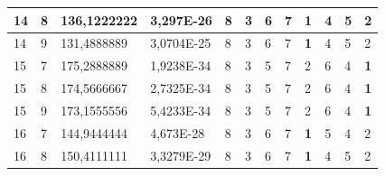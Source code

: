 \documentclass[conference]{IEEEtran}
\begin{document}
\begin{table}[]
\begin{tabular}{|llll|llllllll|}
		\multicolumn{1}{|l|}{14}  & \multicolumn{1}{l|}{8}         & \multicolumn{1}{l|}{136,1222222}   & 3,297E-26  & \multicolumn{1}{l|}{8}   & \multicolumn{1}{l|}{3}   & \multicolumn{1}{l|}{6}   & \multicolumn{1}{l|}{7}   & \multicolumn{1}{l|}{\textbf{1}} & \multicolumn{1}{l|}{4}   & \multicolumn{1}{l|}{5}   & 2                      \\ \hline
		\multicolumn{1}{|l|}{14}  & \multicolumn{1}{l|}{9}         & \multicolumn{1}{l|}{131,4888889}   & 3,0704E-25 & \multicolumn{1}{l|}{8}   & \multicolumn{1}{l|}{3}   & \multicolumn{1}{l|}{6}   & \multicolumn{1}{l|}{7}   & \multicolumn{1}{l|}{\textbf{1}} & \multicolumn{1}{l|}{4}   & \multicolumn{1}{l|}{5}   & 2                      \\ \hline
		\multicolumn{1}{|l|}{15}  & \multicolumn{1}{l|}{7}         & \multicolumn{1}{l|}{175,2888889}   & 1,9238E-34 & \multicolumn{1}{l|}{8}   & \multicolumn{1}{l|}{3}   & \multicolumn{1}{l|}{5}   & \multicolumn{1}{l|}{7}   & \multicolumn{1}{l|}{2}          & \multicolumn{1}{l|}{6}   & \multicolumn{1}{l|}{4}   & \textbf{1}             \\ \hline
		\multicolumn{1}{|l|}{15}  & \multicolumn{1}{l|}{8}         & \multicolumn{1}{l|}{174,5666667}   & 2,7325E-34 & \multicolumn{1}{l|}{8}   & \multicolumn{1}{l|}{3}   & \multicolumn{1}{l|}{5}   & \multicolumn{1}{l|}{7}   & \multicolumn{1}{l|}{2}          & \multicolumn{1}{l|}{6}   & \multicolumn{1}{l|}{4}   & \textbf{1}             \\ \hline
		\multicolumn{1}{|l|}{15}  & \multicolumn{1}{l|}{9}         & \multicolumn{1}{l|}{173,1555556}   & 5,4233E-34 & \multicolumn{1}{l|}{8}   & \multicolumn{1}{l|}{3}   & \multicolumn{1}{l|}{5}   & \multicolumn{1}{l|}{7}   & \multicolumn{1}{l|}{2}          & \multicolumn{1}{l|}{6}   & \multicolumn{1}{l|}{4}   & \textbf{1}             \\ \hline
		\multicolumn{1}{|l|}{16}  & \multicolumn{1}{l|}{7}         & \multicolumn{1}{l|}{144,9444444}   & 4,673E-28  & \multicolumn{1}{l|}{8}   & \multicolumn{1}{l|}{3}   & \multicolumn{1}{l|}{6}   & \multicolumn{1}{l|}{7}   & \multicolumn{1}{l|}{\textbf{1}} & \multicolumn{1}{l|}{5}   & \multicolumn{1}{l|}{4}   & 2                      \\ \hline
		\multicolumn{1}{|l|}{16}  & \multicolumn{1}{l|}{8}         & \multicolumn{1}{l|}{150,4111111}   & 3,3279E-29 & \multicolumn{1}{l|}{8}   & \multicolumn{1}{l|}{3}   & \multicolumn{1}{l|}{6}   & \multicolumn{1}{l|}{7}   & \multicolumn{1}{l|}{\textbf{1}} & \multicolumn{1}{l|}{4}   & \multicolumn{1}{l|}{5}   & 2                      \\ \hline

\end{tabular}
\end{table}
\end{document}
